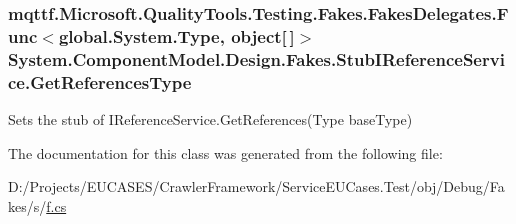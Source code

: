 \hypertarget{class_system_1_1_component_model_1_1_design_1_1_fakes_1_1_stub_i_reference_service_a5b2a9201623308cb29812a921491cdf4}{
\subsubsection[{Get\-References\-Type}]{\setlength{\rightskip}{0pt plus 5cm}mqttf.\-Microsoft.\-Quality\-Tools.\-Testing.\-Fakes.\-Fakes\-Delegates.\-Func$<$global.\-System.\-Type, object\mbox{[}$\,$\mbox{]}$>$ System.\-Component\-Model.\-Design.\-Fakes.\-Stub\-I\-Reference\-Service.\-Get\-References\-Type}}\label{class_system_1_1_component_model_1_1_design_1_1_fakes_1_1_stub_i_reference_service_a5b2a9201623308cb29812a921491cdf4}


Sets the stub of I\-Reference\-Service.\-Get\-References(\-Type base\-Type)



The documentation for this class was generated from the following file\-:\begin{DoxyCompactItemize}
\item 
D\-:/\-Projects/\-E\-U\-C\-A\-S\-E\-S/\-Crawler\-Framework/\-Service\-E\-U\-Cases.\-Test/obj/\-Debug/\-Fakes/s/\hyperlink{s_2f_8cs}{f.\-cs}\end{DoxyCompactItemize}
